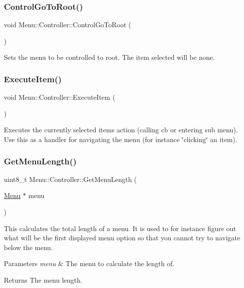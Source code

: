 \subsubsection{\texorpdfstring{Control\+Go\+To\+Root()}{ControlGoToRoot()}}
{\footnotesize\ttfamily void Menu\+::\+Controller\+::\+Control\+Go\+To\+Root (\begin{DoxyParamCaption}{ }\end{DoxyParamCaption})}

Sets the menu to be controlled to root. The item selected will be none. \hypertarget{class_menu_1_1_controller_a0dda40652b8802a8fe39c1ce61a66f1a}{}\label{class_menu_1_1_controller_a0dda40652b8802a8fe39c1ce61a66f1a} 
\subsubsection{\texorpdfstring{Execute\+Item()}{ExecuteItem()}}
{\footnotesize\ttfamily void Menu\+::\+Controller\+::\+Execute\+Item (\begin{DoxyParamCaption}{ }\end{DoxyParamCaption})}

Executes the currently selected items action (calling cb or entering sub menu). Use this as a handler for navigating the menu (for instance \char`\"{}clicking\char`\"{} an item). \hypertarget{class_menu_1_1_controller_a24009cee76b147079041b2130a806027}{}\label{class_menu_1_1_controller_a24009cee76b147079041b2130a806027} 
\subsubsection{\texorpdfstring{Get\+Menu\+Length()}{GetMenuLength()}}
{\footnotesize\ttfamily uint8\+\_\+t Menu\+::\+Controller\+::\+Get\+Menu\+Length (\begin{DoxyParamCaption}\item[{\hyperlink{struct_menu_1_1_menu}{Menu} $\ast$}]{menu }\end{DoxyParamCaption})\hspace{0.3cm}{\ttfamily [private]}}

This calculates the total length of a menu. It is used to for instance figure out what will be the first displayed menu option so that you cannot try to navigate below the menu. 
\begin{DoxyParams}{Parameters}
{\em menu} & The menu to calculate the length of. \\
\hline
\end{DoxyParams}
\begin{DoxyReturn}{Returns}
The menu length. 
\end{DoxyReturn}
\hypertarget{class_menu_1_1_controller_afa4a1e26efe90dd5d9479bb8c84404b6}{}\label{class_menu_1_1_controller_afa4a1e26efe90dd5d9479bb8c84404b6} 
